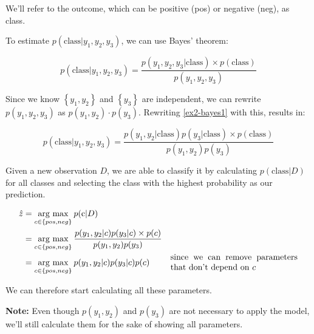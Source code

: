 \documentclass[12pt]{article}
\begin{document}
\begin{enumerate}[leftmargin=\labelsep,resume]
          We'll refer to the outcome, which can be positive (pos) or
          negative (neg), as class.

          To estimate $p(\text{class} | y_1, y_2, y_3)$, we can use Bayes' theorem:

          \begin{equation}\label{ex2-bayes1}
              p(\text{class}| y_1, y_2, y_3) = \frac{p(y_1, y_2, y_3 | \text{class}) \times p(\text{class})}{p(y_1, y_2, y_3)}
          \end{equation}

          Since we know $\left\{y_1, y_2\right\}$ and $\left\{y_3\right\}$ are independent,
          we can rewrite $p(y_1, y_2, y_3)$ as $p(y_1, y_2) \cdot p(y_3)$.
          Rewriting \eqref{ex2-bayes1} with this, results in:

          \begin{equation}\label{ex2-bayes2}
              p(\text{class}| y_1, y_2, y_3) = \frac{p(y_1, y_2 | \text{class}) p(y_3 | \text{class}) \times p(\text{class})}{p(y_1, y_2)p(y_3)}
          \end{equation}

          Given a new observation $D$, we are able to classify it by calculating
          $p(\text{class}|D)$ for all classes and selecting the class with the
          highest probability as our prediction.

          $$
              \begin{aligned}
                  \hat{z} & = \underset{c \in \{pos, neg\}}{\text{arg max}} \medspace p(\text{c} | D)                                                                                                                           \\
                          & = \underset{c \in \{pos, neg\}}{\text{arg max}} \medspace \frac{p(y_1, y_2 | c) p(y_3 | c) \times p(c)}{p(y_1, y_2)p(y_3)}                                                                          \\
                          & = \underset{c \in \{pos, neg\}}{\text{arg max}} \medspace p(y_1, y_2 | c) p(y_3 | c) p(c)                                  & \parbox{15em}{since we can remove parameters that don't depend on $c$}
              \end{aligned}
          $$


          We can therefore start calculating all these parameters.

          \textbf{Note:} Even though $p(y_1, y_2)$ and $p(y_3)$ are not necessary
          to apply the model, we'll still calculate them for the sake of showing
          all parameters.


\end{enumerate}
\end{document}
